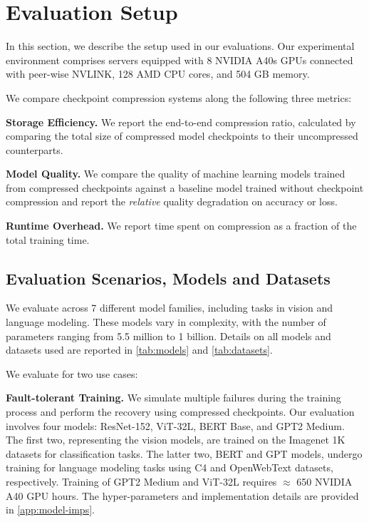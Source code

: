 \section{Evaluation Setup}
\label{sec:eval-setup}
In this section, we describe the setup used in our evaluations. Our experimental environment comprises servers equipped with 8 NVIDIA A40s GPUs connected with peer-wise NVLINK, 128 AMD CPU cores, and 504 GB memory. 

We compare checkpoint compression systems along the following three metrics:

\noindent\textbf{Storage Efficiency.} We report the end-to-end compression ratio, calculated by comparing the total size of compressed model checkpoints to their uncompressed counterparts.

\noindent\textbf{Model Quality.} We compare the quality of machine learning models trained from compressed checkpoints against a baseline model trained without checkpoint compression and report the \emph{relative} quality degradation on accuracy or loss.%


\noindent\textbf{Runtime Overhead.} We report time spent on compression as a fraction of the total training time.%



\subsection{Evaluation Scenarios, Models and Datasets}
We evaluate \sys across 7 different model families, including tasks in vision and language modeling. These models vary in complexity, with the number of parameters ranging from 5.5 million to 1 billion. Details on all models and datasets used are reported in \cref{tab:models} and \cref{tab:datasets}.





We evaluate \sys for two use cases: 

\noindent\textbf{Fault-tolerant Training.} We simulate multiple failures during the training process and perform the recovery using compressed checkpoints. Our evaluation involves four models: ResNet-152, ViT-32L, BERT Base, and GPT2 Medium. The first two, representing the vision models, are trained on the Imagenet 1K datasets for classification tasks. The latter two, BERT and GPT models, undergo training for language modeling tasks using C4 and OpenWebText datasets, respectively. Training of GPT2 Medium and ViT-32L requires $\approx$ 650 NVIDIA A40 GPU hours. The hyper-parameters and implementation details are provided in \cref{app:model-imps}.

